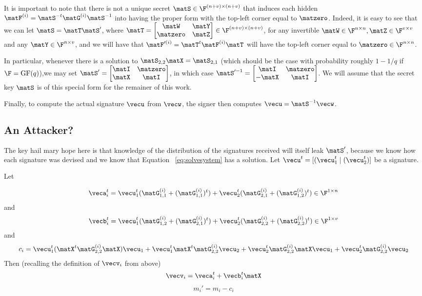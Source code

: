 It is important to note that there is not a unique secret $\matS \in
\F^{(n+v)\times (n+v)}$ that induces each hidden $\matF^{(i)}=\matS^{-t}\matG^{(i)}\matS^{-1}$
into having the proper form with the top-left corner equal to
$\matzero$. Indeed, it is easy to see that we can let
$\matS=\matT\matS'$, where
$\matT=\begin{bmatrix}\matW&\matY\\\matzero&\matZ\\\end{bmatrix} \in
\F^{(n+v) \times (n+v)}$,  for any invertible $\matW \in \F^{n \times
  n}, \matZ \in \F^{v \times v}$ and any $\matY \in \F^{n \times v}$,
and we will have that $\matF'^{(i)} =\matT^{t}\matF^{(i)}\matT$ will
have the top-left corner equal to $\matzero \in \F^{n \times n}$. 

In particular, whenever there is a solution to $\matS_{2,2}\matX=\matS_{2,1}$ (which
should be the case with probability roughly $1-1/q$ if $\F=\text{GF}(q)$),we may set
$\matS'=\begin{bmatrix}\matI&\matzero\\\matX&\matI\\\end{bmatrix}$, in
which case
$\matS'^{-1}=\begin{bmatrix}\matI&\matzero\\-\matX&\matI\\\end{bmatrix}$. We
will assume that the secret key $\matS$ is of this special form for
the remainer of this work. 

Finally, to compute the actual signature $\vecu$ from $\vecw$, the signer then
computes $\vecu=\matS^{-1}\vecw$. 

\subsection{An Attacker?}
\label{sec:an-attacker}

The key hail mary hope here is that knowledge of the distribution of the signatures
received will itself leak $\matS'$, because we know how each signature
was devised and we know that Equation ~\ref{eq:solvesystem} has a
solution. 
Let $\vecu^t = [(\vecu_1^t \mid (\vecu_2^t)]$ be a signature. 


Let 

\[\veca_i^t =
\vecu_1^t(\matG_{1,1}^{(i)}+(\matG_{1,1}^{(i)})^t)+\vecu_2^t(\matG_{2,1}^{(i)}+(\matG_{1,2}^{(i)})^t)
\in \F^{1 \times n}\]
and
\[\vecb_i^t=\vecu_1^t(\matG_{1,2}^{(i)}+(\matG_{2,1}^{(i)})^t)+\vecu_2^t(\matG_{2,2}^{(i)}+(\matG_{2,2}^{(i)})^t)
\in \F^{1 \times v}\] 
and 
\[c_i=\vecu_1^t(\matX^t\matG_{2,2}^{(i)}\matX)\vecu_1+\vecu_1^t\matX^t\matG_{2,2}^{(i)}\vecu_2+\vecu_2^t\matG_{2,2}^{(i)}\matX\vecu_1+\vecu_2^t\matG_{2,2}^{(i)}\vecu_2\]
Then (recalling the definition of $\vecv_i$ from above)
\[\vecv_i=\veca_i^t+\vecb_i^t\matX\]
\[m_i' = m_i - c_i\]

